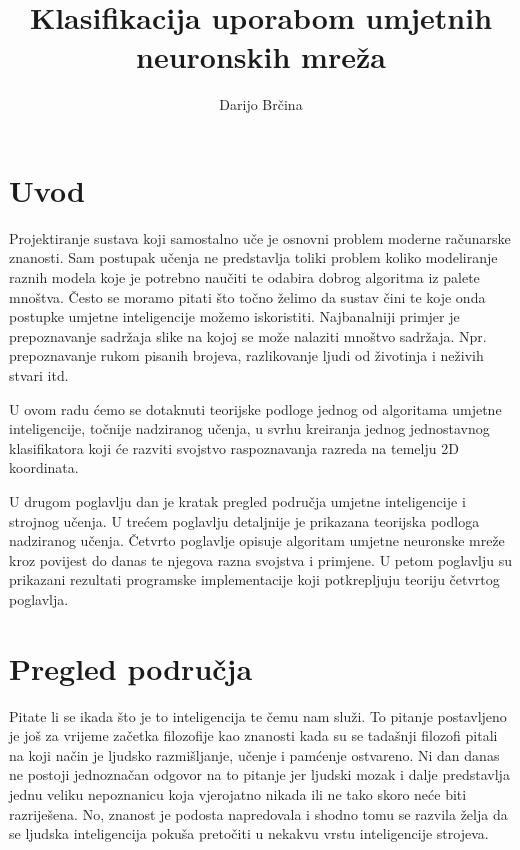 \documentclass[times, utf8, zavrsni]{fer}
\begin{document}
\title{Klasifikacija uporabom umjetnih neuronskih mreža}
\author{Darijo Brčina}

\maketitle




\tableofcontents

\chapter{Uvod}
Projektiranje sustava koji samostalno uče je osnovni problem moderne računarske znanosti. Sam postupak učenja ne predstavlja toliki problem koliko modeliranje raznih modela koje je potrebno naučiti te odabira dobrog algoritma iz palete mnoštva. Često se moramo pitati što točno želimo da sustav čini te koje onda postupke umjetne inteligencije možemo iskoristiti. Najbanalniji primjer je prepoznavanje sadržaja slike na kojoj se može nalaziti mnoštvo sadržaja. Npr. prepoznavanje rukom pisanih brojeva, razlikovanje ljudi od životinja i neživih stvari itd.

U ovom radu ćemo se dotaknuti teorijske podloge jednog od algoritama umjetne inteligencije, točnije nadziranog učenja, u svrhu kreiranja jednog jednostavnog klasifikatora koji će razviti svojstvo raspoznavanja razreda na temelju 2D koordinata.

\bigskip
U drugom poglavlju dan je kratak pregled područja umjetne inteligencije i strojnog učenja. U trećem poglavlju detaljnije je prikazana teorijska podloga nadziranog učenja. Četvrto poglavlje opisuje algoritam umjetne neuronske mreže kroz povijest do danas te njegova razna svojstva i primjene. U petom poglavlju su prikazani rezultati programske implementacije koji potkrepljuju teoriju četvrtog poglavlja.

\chapter{{Pregled područja}}
Pitate li se ikada što je to inteligencija te čemu nam služi. To pitanje postavljeno je još za vrijeme začetka filozofije kao znanosti kada su se tadašnji filozofi pitali na koji način je ljudsko razmišljanje, učenje i pamćenje ostvareno. Ni dan danas ne postoji jednoznačan odgovor na to pitanje jer ljudski mozak i dalje predstavlja jednu veliku nepoznanicu koja vjerojatno nikada ili ne tako skoro neće biti razriješena. No, znanost je podosta napredovala i shodno tomu se razvila želja da se ljudska inteligencija pokuša pretočiti u nekakvu vrstu inteligencije strojeva.
\end{document}
